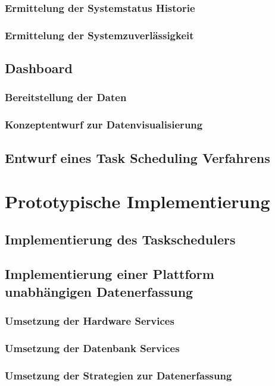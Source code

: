 \subsection{Ermittelung der Systemstatus Historie}
\subsection{Ermittelung der Systemzuverlässigkeit}

\section{Dashboard}\label{sec:Datenvisualisierung}
\subsection{Bereitstellung der Daten}
\subsection{Konzeptentwurf zur Datenvisualisierung}

\section{Entwurf eines Task Scheduling Verfahrens}\label{sec:Gesamtkonzept}

\chapter{Prototypische Implementierung}

\section{Implementierung des Taskschedulers}

\section{Implementierung einer Plattform unabhängigen Datenerfassung}
\subsection{Umsetzung der Hardware Services}
\subsection{Umsetzung der Datenbank Services}
\subsection{Umsetzung der Strategien zur Datenerfassung}

